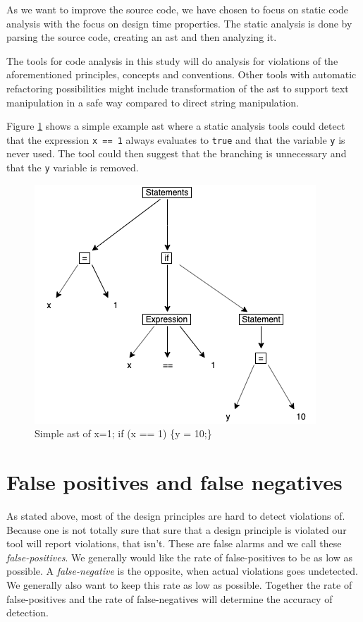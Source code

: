 \documentclass{report}
\begin{document}
As we want to improve the source code, we have chosen to focus on static code analysis with the focus on design time properties. The static analysis is done by parsing the source code, creating an \gls{ast} and then analyzing it.


The tools for code analysis in this study  will do analysis for violations of the aforementioned principles, concepts and conventions. Other tools with automatic refactoring possibilities might include transformation of the \gls{ast} to support text manipulation in a safe way compared to direct string manipulation. 




Figure \ref{fig:ast} shows a simple example \gls{ast} where a static analysis tools could detect that the expression \texttt{x == 1} always evaluates to \texttt{true} and that the variable \texttt{y} is never used. The tool could then suggest that the branching is unnecessary and that the \texttt{y} variable is removed.  

\begin{figure}[h!]
	\centering
	\includegraphics[width=\linewidth/2]{report/images/ast.png}
	\caption{Simple \gls{ast} of x=1; if (x == 1) \{y = 10;\}}
	\label{fig:ast}
\end{figure}



\section{False positives and false negatives}
As stated above, most of the design principles are hard to detect violations of. Because one is not totally sure that sure that a design principle is violated our tool will report violations, that isn't. These are false alarms and we call these \textit{false-positives}. We generally would like the rate of false-positives to be as low as possible. A \textit{false-negative} is the opposite, when actual violations goes undetected. We generally also want to keep this rate as low as possible. Together the rate of false-positives and the rate of false-negatives will determine the accuracy of detection. 
\end{document}
